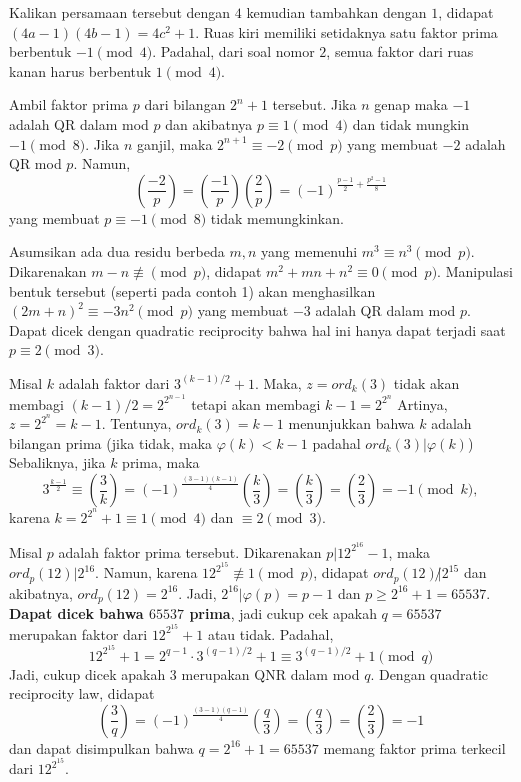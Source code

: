 \documentclass[11pt]{scrartcl}
\begin{document}
\begin{problem}
    Kalikan persamaan tersebut dengan $4$ kemudian tambahkan dengan $1$, didapat $(4a - 1)(4b - 1) = 4c^2 + 1$. Ruas kiri memiliki setidaknya satu faktor prima berbentuk $-1 \pmod{4}$. Padahal, dari soal nomor $2$, semua faktor dari ruas kanan harus berbentuk $1 \pmod{4}$.
\end{problem}

\begin{problem}
    Ambil faktor prima $p$ dari bilangan $2^n + 1$ tersebut. Jika $n$ genap maka $-1$ adalah QR dalam mod $p$ dan akibatnya $p \equiv 1 \pmod{4}$ dan tidak mungkin $-1 \pmod{8}$. Jika $n$ ganjil, maka $2^{n + 1} \equiv -2 \pmod{p}$ yang membuat $-2$ adalah QR mod $p$. Namun, \[\left(\dfrac{-2}{p}\right) = \left(\dfrac{-1}{p}\right)\left(\dfrac{2}{p}\right) = (-1)^{\frac{p - 1}{2} + \frac{p^2 - 1}{8}}\] yang membuat $p \equiv -1 \pmod{8}$ tidak memungkinkan.
\end{problem}

\begin{problem}
    Asumsikan ada dua residu berbeda $m, n$ yang memenuhi $m^3 \equiv n^3 \pmod{p}$. Dikarenakan $m - n \not\equiv \pmod{p}$, didapat $m^2 + mn + n^2 \equiv 0 \pmod{p}$. Manipulasi bentuk tersebut (seperti pada contoh 1) akan menghasilkan $(2m + n)^2 \equiv -3n^2 \pmod{p}$ yang membuat $-3$ adalah QR dalam mod $p$. Dapat dicek dengan quadratic reciprocity bahwa hal ini hanya dapat terjadi saat $p \equiv 2\pmod{3}$.
\end{problem}

\begin{problem}
    Misal $k$ adalah faktor dari $3^{(k - 1)/2} + 1$. Maka, $z = ord_k(3)$ tidak akan membagi $(k - 1)/2 = 2^{2^{n - 1}}$ tetapi akan membagi $k - 1 = 2^{2^n}$ Artinya, $z = 2^{2^n} = k - 1$. Tentunya, $ord_k(3) = k - 1$ menunjukkan bahwa $k$ adalah bilangan prima (jika tidak, maka $\varphi(k) < k - 1$ padahal $ord_k(3)|\varphi(k)$)
    Sebaliknya, jika $k$ prima, maka \[3^{\frac{k-1}2}\equiv \left(\frac3k\right)=(-1)^{\frac{(3-1)(k-1)}4}\left(\frac k3\right)=\left(\frac k3\right)=\left(\frac 23\right)=-1\pmod k,\] karena $k = 2^{2^n} + 1\equiv 1 \pmod{4}$ dan $\equiv 2 \pmod{3}$.
\end{problem}

\begin{problem}
    Misal $p$ adalah faktor prima tersebut. Dikarenakan $p|12^{2^{16}} - 1$, maka $ord_p(12)|2^{16}$. Namun, karena $12^{2^{15}} \not\equiv 1 \pmod{p}$, didapat $ord_p(12)\not|2^{15}$ dan akibatnya, $ord_p(12) = 2^{16}$. Jadi, $2^{16}|\varphi(p) = p - 1$ dan $p \geq 2^{16} + 1 = 65537$. \textbf{Dapat dicek bahwa $65537$ prima}, jadi cukup cek apakah $q = 65537$ merupakan faktor dari $12^{2^{15}} + 1$ atau tidak. Padahal,
    \[12^{2^{15}} + 1 = 2^{q - 1}\cdot 3^{(q - 1)/2} + 1 \equiv 3^{(q - 1)/2} + 1 \pmod{q}\] Jadi, cukup dicek apakah $3$ merupakan QNR dalam mod $q$. Dengan quadratic reciprocity law, didapat \[\left(\dfrac{3}{q}\right) = (-1)^{\frac{(3 - 1)(q - 1)}{4}}\left(\dfrac{q}{3}\right) = \left(\dfrac{q}{3}\right) = \left(\dfrac{2}{3}\right) = -1\] dan dapat disimpulkan bahwa $q = 2^{16} + 1 = 65537$ memang faktor prima terkecil dari $12^{2^{15}}$.
\end{problem}
\end{document}
